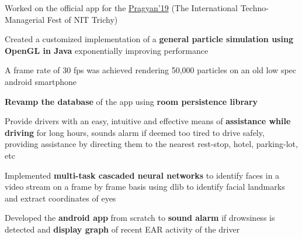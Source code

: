 \documentclass[]{deedy-resume-openfont}
\begin{document}
\begin{minipage}[t]{0.69\textwidth}
\begin{tightemize}
\item Worked on the official app for the \href{https://www.pragyan.org/19/home/}{Pragyan’19} (The International Techno-Managerial Fest of NIT Trichy) \item Created a customized implementation of a \textbf{general particle simulation using OpenGL in Java} exponentially improving performance \item A frame rate of 30 fps was achieved rendering 50,000 particles on an old low spec android smartphone \item \textbf{Revamp the database} of the app using \textbf{room persistence library}
\end{tightemize}
\sectionsep

\begin{tightemize}
\item Provide drivers with an easy, intuitive and effective means of \textbf{assistance while driving} for long hours, sounds alarm if deemed too tired to drive safely, providing assistance by directing them to the nearest rest-stop, hotel, parking-lot, etc \item Implemented \textbf{multi-task cascaded neural networks} to identify faces in a video stream on a frame by frame basis using dlib to identify facial landmarks and extract coordinates of eyes \item Developed the \textbf{android app} from scratch to \textbf{sound alarm} if drowsiness is detected and \textbf{display graph} of recent EAR activity of the driver
\end{tightemize}
\sectionsep


\end{minipage}
\end{document}
